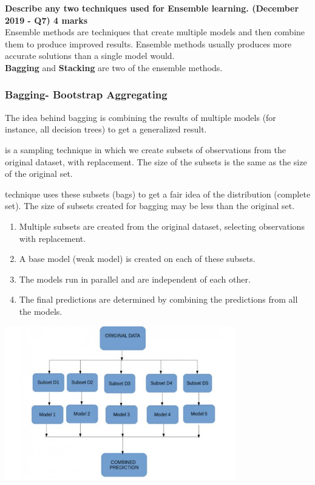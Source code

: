 \textbf{\textcolor{LightMagenta}{Describe any two techniques used for Ensemble learning. (December 2019 - Q7) \hfill 4 marks}} \\[5pt]


Ensemble methods are techniques that create multiple models and then combine them to produce improved results. Ensemble methods usually produces more accurate solutions than a single model would. 
\\ \textbf{Bagging} and \textbf{Stacking} are two of the ensemble methods. 
\subsubsection*{Bagging- \textbf{B}ootstrap \textbf{Agg}regating}
The idea behind bagging is combining the results of multiple models (for instance, all decision trees) to get a generalized result.

\textcolor{purple}{\underline{}} is a sampling technique in which we create subsets of observations from the original dataset, with replacement. The size of the subsets is the same as the size of the original set.

\textcolor{purple}{\underline{}}  technique uses these subsets (bags) to get a fair idea of the distribution (complete set). The size of subsets created for bagging may be less than the original set.
\begin{enumerate}
    \item Multiple subsets are created from the original dataset, selecting observations with replacement.
    \item A base model (weak model) is created on each of these subsets.
    \item The models run in parallel and are independent of each other.
    \item The final predictions are determined by combining the predictions from all the models.
\end{enumerate}
\begin{center}
    \includegraphics[width=10cm]{Images/A8_img1.jpg}
\end{center}
